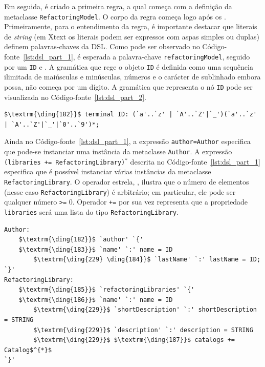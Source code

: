 Em seguida, é criado a primeira regra, a qual começa com a definição da metaclasse \texttt{RefactoringModel}. O corpo da regra começa logo após os \aspas{\texttt{:}}. Primeiramente, para o entendimento da regra, é importante destacar que literais de \textit{string} (em Xtext os literais podem ser expressos com aspas simples ou duplas) definem palavras-chaves da DSL. Como pode ser observado no Código-fonte~\ref{lst:dsl_part_1}, é esperada a palavra-chave \texttt{refactoringModel}, seguido por um \texttt{ID} e \aspas{\{}. A gramática que rege o objeto \texttt{ID} é definida como uma sequência ilimitada de maiúsculas e minúsculas, números e o carácter de sublinhado embora possa, não começa por um dígito. A gramática que representa o nó \texttt{ID} pode ser visualizada no Código-fonte~\ref{lst:dsl_part_2}. 

\begin{lstlisting}[language=Xtext, frame=single, basicstyle=\scriptsize, mathescape=true, label={lst:dsl_part_2}, caption={Gramática da DSL - parte 2}]
	$\textrm{\ding{182}}$ terminal ID: (`a'..`z' | `A'..`Z'|`_')(`a'..`z' | `A'..`Z'|`_'|`0'..`9')*;
\end{lstlisting}

Ainda no Código-fonte~\ref{lst:dsl_part_1}, a expressão \texttt{author=Author} especifica que pode-se instanciar uma instância da metaclasse \texttt{Author}. A expressão \texttt{(libraries += RefactoringLibrary)$^{*}$} descrita no Código-fonte~\ref{lst:dsl_part_1} especifica que é possível  instanciar várias instâncias da metaclasse \texttt{RefactoringLibrary}. O operador estrela, \aspas{\texttt{*}}, ilustra que o número de elementos (nesse caso \texttt{RefactoringLibrary}) é arbitrário; em particular, ele pode ser qualquer número \texttt{>=} 0. Operador \texttt{+=} por sua vez representa que a propriedade \texttt{libraries} será uma lista do tipo \texttt{RefactoringLibrary}.

\begin{lstlisting}[language=Xtext, frame=single, basicstyle=\scriptsize, mathescape=true, label={lst:dsl_part_3}, caption={Gramática da DSL - parte 3}]
Author:
	$\textrm{\ding{182}}$ `author' `{'
	$\textrm{\ding{183}}$ `name' `:' name = ID  
		$\textrm{\ding{229} \ding{184}}$ `lastName' `:' lastName = ID; 
`}'
RefactoringLibrary:
	$\textrm{\ding{185}}$ `refactoringLibraries' `{'
	$\textrm{\ding{186}}$ `name' `:' name = ID  
		$\textrm{\ding{229}}$ `shortDescription' `:' shortDescription = STRING
		$\textrm{\ding{229}}$ `description' `:' description = STRING
		$\textrm{\ding{229}}$ $\textrm{\ding{187}}$ catalogs += Catalog$^{*}$
`}'
\end{lstlisting}

